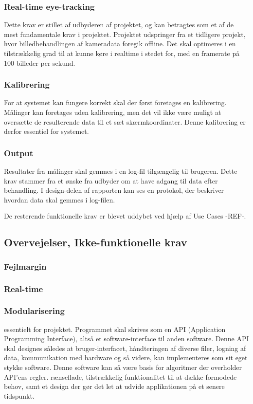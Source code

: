\documentclass[a4paper,oneside,12pt]{article}
\begin{document}
	\subsubsection{Real-time eye-tracking}
	Dette krav er stillet af udbyderen af projektet, og kan betragtes som et af de mest fundamentale krav i projektet. Projektet udspringer fra et tidligere projekt, hvor billedbehandlingen af kameradata foregik offline. Det skal optimeres i en tilstrækkelig grad til at kunne køre i realtime i stedet for, med en framerate på 100 billeder per sekund.
	
	\subsubsection{Kalibrering}
	For at systemet kan fungere korrekt skal der først foretages en kalibrering. Målinger kan foretages uden kalibrering, men det vil ikke være muligt at oversætte de resulterende data til et sæt skærmkoordinater. Denne kalibrering er derfor essentiel for systemet.
	
	\subsubsection{Output}
	Resultater fra målinger skal gemmes i en log-fil tilgængelig til brugeren. Dette krav stammer fra et ønske fra udbyder om at have adgang til data efter behandling. I
	design-delen af rapporten kan ses en protokol, der beskriver hvordan data skal gemmes i log-filen. 
	
	
	
	De resterende funktionelle krav er blevet uddybet ved hjælp af Use Cases -REF-.
	
	
	\subsection{Overvejelser, Ikke-funktionelle krav}
	
	\subsubsection{Fejlmargin}
	
	
	
	\subsubsection{Real-time}
	
	
	
	\subsubsection{Modularisering}
	essentielt for projektet. Programmet skal skrives som en API (Application Programming Interface), altså et software-interface til anden software. Denne API skal designes således at bruger-interfacet, håndteringen af diverse filer, logning af data, kommunikation med hardware og så videre, kan implementeres som sit eget stykke software. Denne software kan så være basis for algoritmer der overholder API'ens regler. 
	rænseflade, tilstrækkelig
	funktionalitet til at dække formodede behov, samt et design der gør det let at udvide
	applikationen på et senere tidspunkt.
	
\end{document}
